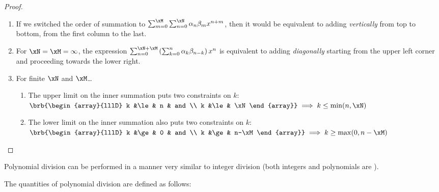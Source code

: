 \begin{proof}
\begin{enumerate}
\item If we switched the order of summation to
      $\sum_{m=0}^\xM \sum_{n=0}^\xN \alpha_n \beta_m x^{n+m}$,
      then it would be equivalent to adding {\em vertically}
      from top to bottom,
      from the first column to the last.

\item For $\xN=\xM=\infty$, the expression
      $\sum_{n=0}^{\xN+\xM} \left(\sum_{k=0}^n \alpha_k \beta_{n-k} \right) x^n$
      is equivalent to adding {\em diagonally}
      starting from the upper left corner and proceeding
      towards the lower right.

\item For finite $\xN$ and $\xM$\ldots
  \begin{enumerate}
    \item The upper limit on the inner summation puts two constraints on $k$:
      \\\indentx$\brb{\begin{array}{lllD}
        k &\le& n  & and \\
        k &\le& \xN
      \end{array}}
      \implies
      k\le\min(n,\xN)$

    \item The lower limit on the inner summation also puts two constraints on $k$:
      \\\indentx$\brb{\begin{array}{lllD}
        k &\ge& 0     & and \\
        k &\ge& n-\xM
      \end{array}}
      \implies
      k\ge\max(0,n-\xM)$
  \end{enumerate}
\end{enumerate}
\end{proof}

Polynomial division can be performed in a manner very similar to integer division
(both integers and polynomials are ).



\begin{definition}
The quantities of polynomial division are defined as follows:
\end{definition}


